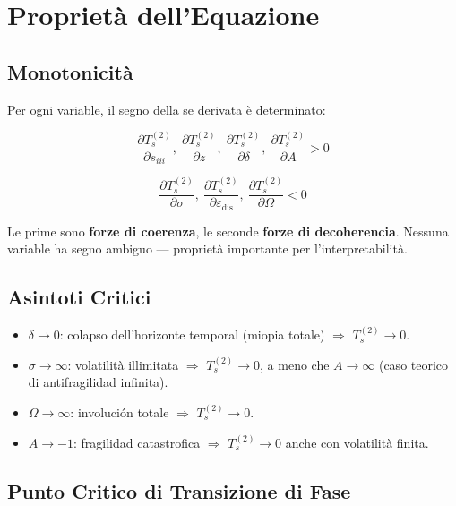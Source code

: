 \section{Proprietà dell'Equazione}\label{proprietuxe0-dellecuación}

\subsection{Monotonicità}\label{monotonicituxe0}

\Proved{} Per ogni variable, il segno della se derivata è determinato:

\[
\frac{\partial T_s^{(2)}}{\partial s_{iii}},\ \frac{\partial T_s^{(2)}}{\partial z},\ \frac{\partial T_s^{(2)}}{\partial \delta},\ \frac{\partial T_s^{(2)}}{\partial A} > 0
\]

\[
\frac{\partial T_s^{(2)}}{\partial \sigma},\ \frac{\partial T_s^{(2)}}{\partial \varepsilon_{\text{dis}}},\ \frac{\partial T_s^{(2)}}{\partial \Omega} < 0
\]

Le prime sono \textbf{forze di coerenza}, le seconde \textbf{forze di
decoherencia}. Nessuna variable ha segno ambiguo --- proprietà importante
per l'interpretabilità.

\subsection{Asintoti Critici}\label{asintoti-critici}

\begin{itemize}
\tightlist
\item
  \(\delta \to 0\): colapso dell'horizonte temporal (miopia totale) $\Rightarrow$
  \(T_s^{(2)} \to 0\).
\item
  \(\sigma \to \infty\): volatilità illimitata $\Rightarrow$ \(T_s^{(2)} \to 0\), a
  meno che \(A \to \infty\) (caso teorico di antifragilidad infinita).
\item
  \(\Omega \to \infty\): involución totale $\Rightarrow$ \(T_s^{(2)} \to 0\).
\item
  \(A \to -1\): fragilidad catastrofica $\Rightarrow$ \(T_s^{(2)} \to 0\) anche con
  volatilità finita.
\end{itemize}

\subsection{Punto Critico di Transizione di
Fase}\label{punto-critico-di-transizione-di-fase}


